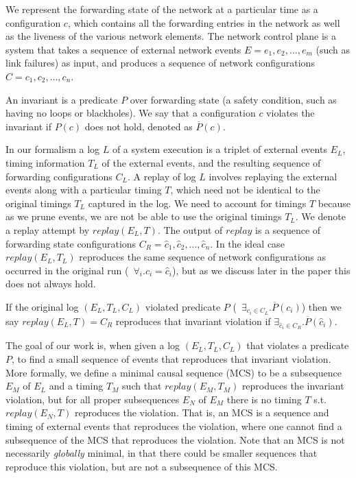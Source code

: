 We represent the forwarding state of the network
at a particular time as a configuration $c$, which contains all the forwarding
entries in the network
as well as the liveness of the various network elements.
The network control plane is a system that takes a sequence of
external network events $E = e_1,e_2,\dots,e_m$ (such as link failures) as input,
and produces a sequence of network configurations
$C = c_1,c_2,\dots,c_n$.

An invariant is a predicate $P$ over forwarding state (a safety
condition, such as having no loops or blackholes). We say that a configuration
$c$ violates the invariant if $P(c)$ does not
hold, denoted as $\overline{P}(c)$.

In our formalism a log $L$ of a system execution is a triplet of external events $E_L$,
timing information $T_L$ of the external events, and the resulting sequence of forwarding
configurations $C_L$.
A replay of log $L$ involves replaying the external events along with a
particular timing $T$,
which need not be identical to the original timings $T_L$ captured in the log.
We need to account for timings $T$ because as we prune events, we
are not be able to use the original timings $T_L$.
We denote a replay attempt by $replay(E_L,T)$.
The output of $replay$ is a sequence of forwarding state configurations
$C_R = \hat{c}_1,\hat{c}_2,\dots,\hat{c}_n$. In the ideal case $replay(E_L,T_L)$ reproduces the same
sequence of network configurations as occurred in the original run
(\ie~$\forall_i. c_i = \hat{c}_i$), but as we discuss later in the paper
this does not always hold.

If the original log $(E_L, T_L, C_L)$ violated predicate $P$
(\ie~$\exists_{c_i \in C_L}. \overline{P}(c_i)$)
then we say $replay(E_L,T) = C_R$ reproduces that invariant violation if
$\exists_{\hat{c}_i \in C_R}. \overline{P}(\hat{c}_i)$.

The goal of our work is, when given a log $(E_L, T_L, C_L)$ that violates a predicate $P$, to find a small sequence of events that reproduces that
invariant violation.  More formally, we define a minimal causal sequence (MCS)
to be a subsequence $E_M$
of $E_L$ and a timing $T_M$ such
that $replay(E_M,T_M)$ reproduces the invariant violation, but for all proper
subsequences $E_N$ of $E_M$
there is no timing $T$ s.t. $replay(E_N,T)$ reproduces the violation.
That is, an MCS is a sequence and timing of external events that reproduces the violation,
where one cannot find a subsequence of the MCS that reproduces the violation.
Note that an MCS is not necessarily {\em globally} minimal, in that there could be smaller
sequences that reproduce this violation, but are not a subsequence of this MCS.


